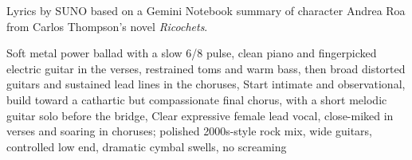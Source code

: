 
\begin{notes}
Lyrics by SUNO based on a Gemini Notebook summary of character Andrea Roa from Carlos Thompson's novel \emph{Ricochets}.
\end{notes}
\begin{style}
Soft metal power ballad with a slow 6/8 pulse, clean piano and fingerpicked electric guitar in the verses, restrained toms and warm bass, then broad distorted guitars and sustained lead lines in the choruses, Start intimate and observational, build toward a cathartic but compassionate final chorus, with a short melodic guitar solo before the bridge, Clear expressive female lead vocal, close-miked in verses and soaring in choruses; polished 2000s-style rock mix, wide guitars, controlled low end, dramatic cymbal swells, no screaming
\end{style}
